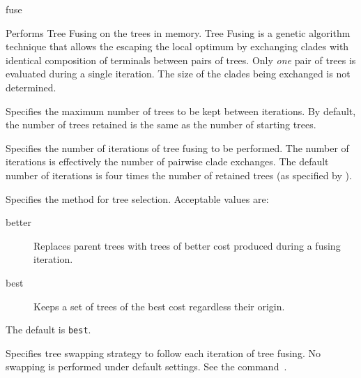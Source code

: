 \begin{command}{fuse}{}


    \begin{poydescription}
            Performs Tree Fusing on the trees in memory. Tree Fusing is a
            genetic algorithm technique that allows the escaping the local optimum
            by exchanging clades with identical composition of terminals between
            pairs of trees. Only \emph{one} pair of trees is evaluated during a single iteration.
            The size of the clades being exchanged is not determined.
    \end{poydescription}

    \begin{arguments}
            {Specifies the maximum number of trees to be kept between iterations.
            By default, the number of trees retained is the same as the number
            of starting trees.}
            {}

            {Specifies the number of iterations of tree fusing to be performed. The
            number of iterations is effectively the number of pairwise clade exchanges. 
            The default number of iterations is four times the number of retained
            trees (as specified by ).}
            {}

            {Specifies the method for tree selection. Acceptable values
            are:
            \begin{description}
                \item[better] Replaces parent trees with trees of better cost
                produced during a fusing iteration.
                \item[best] Keeps a set of trees of the best cost regardless their origin.
            \end{description}
            The default is \texttt{best}.}
            {}

            {Specifies tree swapping strategy to follow each iteration of tree fusing.
            No swapping is performed under default settings.
            See the command~.}
            {}

    \end{arguments}
    

\end{command}

